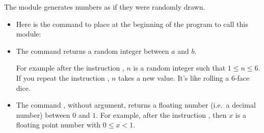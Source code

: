 \documentclass[11pt,class=report,crop=false]{standalone}
\begin{document}
\begin{cours}


The  module generates numbers as if they were randomly drawn.
\begin{itemize}
  \item Here is the command to place at the beginning of the program to call this module:
  
  \item The command  returns a random integer between $a$ and $b$.
  
  For example after the instruction , $n$ is a random integer such that $1 \le n \le 6$.
  If you repeat the instruction , $n$ takes a new value. It's like rolling a 6-face dice.
  
  \item The command , without argument, returns a floating number (i.e.~a decimal number) between $0$ and $1$.  
  For example, after the instruction , then $x$ is a floating point number with $0 \le x < 1$.
\end{itemize}


\end{cours}


\end{document}
